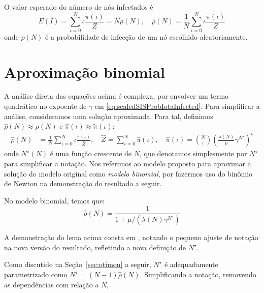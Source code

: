	    O valor esperado do número de nós infectados é
    	\begin{equation}
    	    E(I) = \sum\limits_{\iota = 0}^{N} \iota \frac{\tilde{\pi}(\iota)} {Z} = N\rho(N), \quad \rho(N) = \frac{1}{N} \sum\limits_{\iota = 0}^{N} \iota \frac{\tilde{\pi}(\iota)}{Z} \label{eq:scaledSIS_espected_infecteds}
    	\end{equation}
	    onde $\rho(N)$	é a probabilidade de  infecção de um nó escolhido aleatoriamente. 

    \section{Aproximação binomial} \label{sec:modelbinon}
	    A análise direta das equações acima é complexa, por envolver um termo quadrático no expoente de $\gamma$ em \eqref{eq:scaledSISProbIotaInfected}.  Para simplificar a análise, consideramos  uma solução aproximada. Para tal, definimos $\hat\rho(N) \approx \rho(N)$ e $\hat\pi(\iota) \approx \tilde\pi(\iota)$:
		\begin{align}
		  \hat {\rho}(N)	&=  \frac{1}{N} \sum\limits_{\iota=0}^{N}\iota \frac{\hat{\pi}(\iota)}{{\hat Z}}, \quad \hat{Z} = \sum\limits_{\iota=0}^{N} \hat{\pi}(\iota), \quad \hat{\pi}(\iota)	=  \binom{N}{\iota} \left(\frac{\lambda(N)}{\mu}\gamma^{N^{\star}}\right)^{\iota}\label{eq:rho_Nhat1} 
		\end{align}
		onde $N^{\star}(N)$ é uma função crescente de $N$, que denotamos simplesmente por $N^{\star}$ para simplificar a notação.  Nos referimos ao modelo proposto para aproximar a solução do modelo original como \emph{modelo binomial}, por fazermos uso do binômio de Newton na demonstração do resultado a seguir. 

		\begin{lemma}
			No modelo binomial,  temos que:
				\begin{equation}
							\hat{\rho}(N) =   \frac{1}  {1+ \mu/(\lambda(N) \gamma^{N^{\star}} )  }  \label{eq:mainlema} %
				\end{equation} 
		\end{lemma}	

		A demonstração do lema acima consta em  \cite{rufino2018contaminaccao}, notando o pequeno ajuste de notação na nova versão do resultado, refletindo a nova definição de $N^{\star}$.

	    Como discutido na Seção~\ref{sec:otimon} a seguir, $N^{\star}$ é adequadamente parametrizado como $N^{\star} = (N-1)\hat{\rho}(N)$. Simplificando a notação,  removendo as dependências  com relação a $N$,

